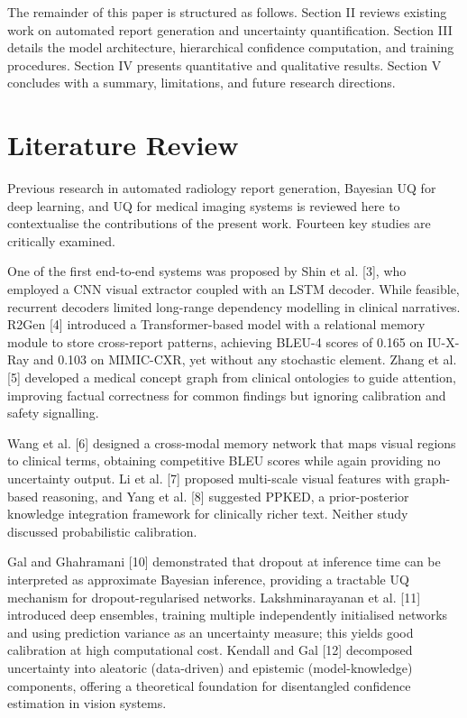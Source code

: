 \documentclass{jcst}
\begin{document}
The remainder of this paper is structured as follows. Section II reviews existing work on automated report generation and uncertainty quantification. Section III details the model architecture, hierarchical confidence computation, and training procedures. Section IV presents quantitative and qualitative results. Section V concludes with a summary, limitations, and future research directions.

\section{Literature Review}
Previous research in automated radiology report generation, Bayesian UQ for deep learning, and UQ for medical imaging systems is reviewed here to contextualise the contributions of the present work. Fourteen key studies are critically examined.

One of the first end-to-end systems was proposed by Shin et al. [3], who employed a CNN visual extractor coupled with an LSTM decoder. While feasible, recurrent decoders limited long-range dependency modelling in clinical narratives. R2Gen [4] introduced a Transformer-based model with a relational memory module to store cross-report patterns, achieving BLEU-4 scores of 0.165 on IU-X-Ray and 0.103 on MIMIC-CXR, yet without any stochastic element. Zhang et al. [5] developed a medical concept graph from clinical ontologies to guide attention, improving factual correctness for common findings but ignoring calibration and safety signalling.

Wang et al. [6] designed a cross-modal memory network that maps visual regions to clinical terms, obtaining competitive BLEU scores while again providing no uncertainty output. Li et al. [7] proposed multi-scale visual features with graph-based reasoning, and Yang et al. [8] suggested PPKED, a prior-posterior knowledge integration framework for clinically richer text. Neither study discussed probabilistic calibration.

Gal and Ghahramani [10] demonstrated that dropout at inference time can be interpreted as approximate Bayesian inference, providing a tractable UQ mechanism for dropout-regularised networks. Lakshminarayanan et al. [11] introduced deep ensembles, training multiple independently initialised networks and using prediction variance as an uncertainty measure; this yields good calibration at high computational cost. Kendall and Gal [12] decomposed uncertainty into aleatoric (data-driven) and epistemic (model-knowledge) components, offering a theoretical foundation for disentangled confidence estimation in vision systems.
\end{document}
